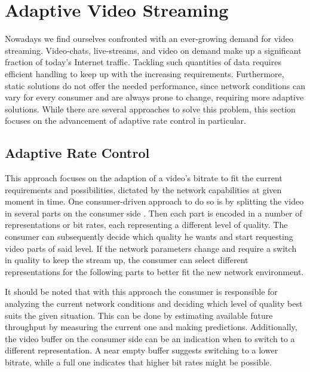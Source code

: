 \section{Adaptive Video Streaming}
Nowadays we find ourselves confronted with an ever-growing demand for video streaming. Video-chats, live-streams, and video on demand make up a significant fraction of today's Internet traffic. Tackling such quantities of data requires efficient handling to keep up with the increasing requirements. Furthermore, static solutions do not offer the needed performance, since network conditions can vary for every consumer and are always prone to change, requiring more adaptive solutions. While there are several approaches to solve this problem, this section focuses on the advancement of adaptive rate control in particular. 

\subsection{Adaptive Rate Control}
This approach focuses on the adaption of a video's bitrate to fit the current requirements and possibilities, dictated by the network capabilities at given moment in time. One consumer-driven approach to do so is by splitting the video in several parts on the consumer side \cite{MQGW12}. Then each part is encoded in a number of representations or bit rates, each representing a different level of quality. The consumer can subsequently decide which quality he wants and start requesting video parts of said level. If the network parameters change and require a switch in quality to keep the stream up, the consumer can select different representations for the following parts to better fit the new network environment.

It should be noted that with this approach the consumer is responsible for analyzing the current network conditions and deciding which level of quality best suits the given situation. This can be done by estimating available future throughput by measuring the current one and making predictions. Additionally, the video buffer on the consumer side can be an indication when to switch to a different representation. A near empty buffer suggests switching to a lower bitrate, while a full one indicates that higher bit rates might be possible. \cite{MQGW12}

